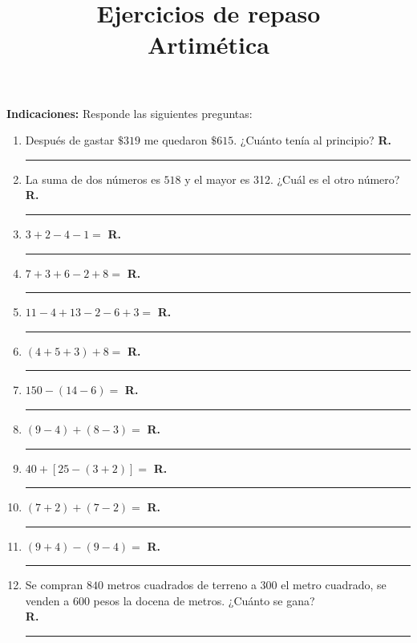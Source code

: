 

\title{Ejercicios de repaso \\ {\Large Artimética}\vspace{-3ex}}
\author{}
\date{ }



\maketitle
\fontsize{14}{14}\selectfont

\textbf{Indicaciones: } Responde las siguientes preguntas:

\begin{enumerate}
\item Después de gastar $\$319$ me quedaron $\$615$. ¿Cuánto tenía al principio? \hspace{0.3cm} \textbf{R.} \rule{3cm}{0.1mm}
\item La suma de dos números es $518$ y el mayor es 312. ¿Cuál es el otro número? \hspace{0.3cm} \textbf{R.} \rule{3cm}{0.1mm}
\item $3 + 2 - 4 -1 =$ \hspace{0.3cm} \textbf{R.} \rule{3cm}{0.1mm}
\item $7 + 3 + 6 - 2 + 8 =$ \hspace{0.3cm} \textbf{R.} \rule{3cm}{0.1mm}
\item $11 - 4 + 13 - 2 - 6 + 3 =$ \hspace{0.3cm} \textbf{R.} \rule{3cm}{0.1mm}
\item $(4 + 5 + 3) + 8 =$ \hspace{0.3cm} \textbf{R.} \rule{3cm}{0.1mm}
\item $150 - (14 - 6) =$ \hspace{0.3cm} \textbf{R.} \rule{3cm}{0.1mm}
\item $(9 -4) + (8 - 3) =$ \hspace{0.3cm} \textbf{R.} \rule{3cm}{0.1mm}
\item $40 + [25 - (3 + 2)] =$ \hspace{0.3cm} \textbf{R.} \rule{3cm}{0.1mm}
\item $(7 + 2) + (7 -2) =$ \hspace{0.3cm} \textbf{R.} \rule{3cm}{0.1mm}
\item $(9 + 4) - (9 -4) =$ \hspace{0.3cm} \textbf{R.} \rule{3cm}{0.1mm}
\item Se compran $840$ metros cuadrados de terreno a $300$ el metro cuadrado, se venden a $600$ pesos la docena de metros. ¿Cuánto se gana? \\
\hspace{0.3cm} \textbf{R.} \rule{3cm}{0.1mm}
\end{enumerate}


